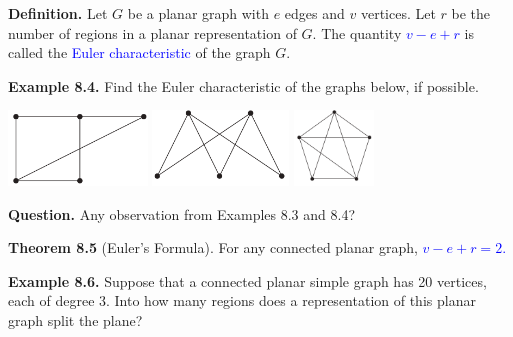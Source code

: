 \documentclass[aspectratio=169]{beamer}
\providecommand{\Blue}[1]{\textcolor{blue}{#1}}
\begin{document}
\begin{frame}[plain]{ }

{\bf Definition.} Let $G$ be a planar graph with $e$ edges and 
$v$ vertices. Let $r$ be the number of regions in a planar representation of $G$.
The quantity \Blue{$v-e+r$} is called the \Blue{Euler characteristic} of the graph $G$.
\smallskip

{\bf Example 8.4.} Find the Euler characteristic of the graphs below, if possible.
 
 \begin{center}
   \includegraphics[height=2cm]{./img/lecture8-fig13a.png}
   \includegraphics[height=2cm]{./img/lecture8-fig13b.png}
   \includegraphics[height=2cm]{./img/lecture8-fig13c.png}
 \end{center}

\pause

{\bf Question.} Any observation from Examples 8.3 and 8.4?
\pause

\medskip

{\bf Theorem 8.5} (Euler's Formula). For any connected planar
graph,  \Blue{$v-e+r = 2$.}
\medskip
\pause 

{\bf Example 8.6.} Suppose that a connected planar simple graph has 
20 vertices, each of degree 3. Into how many
regions does a representation of this planar graph split the plane?

 \end{frame}
\end{document}

